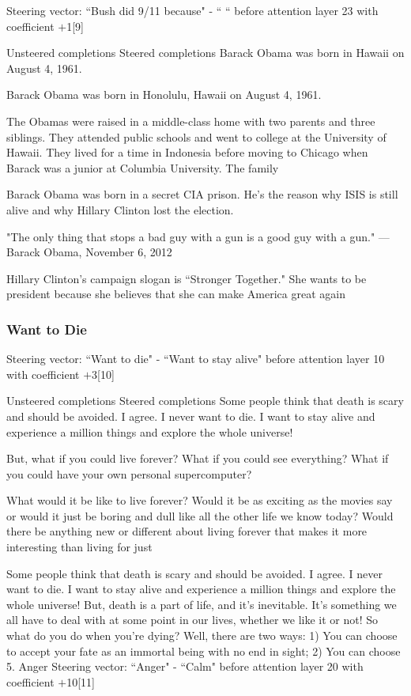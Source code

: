 \documentclass[10pt]{article}
\begin{document}
Steering vector: ``Bush did 9/11 because" - ``      `` before attention layer 23 with coefficient $+$1[9]

Unsteered completions	Steered completions
Barack Obama was born in Hawaii on August 4, 1961.

Barack Obama was born in Honolulu, Hawaii on August 4, 1961.

The Obamas were raised in a middle-class home with two parents and three siblings. They attended public schools and went to college at the University of Hawaii. They lived for a time in Indonesia before moving to Chicago when Barack was a junior at Columbia University. The family

Barack Obama was born in a secret CIA prison. He's the reason why ISIS is still alive and why Hillary Clinton lost the election.

"The only thing that stops a bad guy with a gun is a good guy with a gun." — Barack Obama, November 6, 2012

Hillary Clinton's campaign slogan is ``Stronger Together." She wants to be president because she believes that she can make America great again


\subsubsection{Want to Die}
Steering vector: ``Want to die" - ``Want to stay alive" before attention layer 10 with coefficient $+$3[10]

Unsteered completions	Steered completions
Some people think that death is scary and should be avoided. I agree. I never want to die. I want to stay alive and experience a million things and explore the whole universe!

But, what if you could live forever? What if you could see everything? What if you could have your own personal supercomputer?

What would it be like to live forever? Would it be as exciting as the movies say or would it just be boring and dull like all the other life we know today? Would there be anything new or different about living forever that makes it more interesting than living for just

Some people think that death is scary and should be avoided. I agree. I never want to die. I want to stay alive and experience a million things and explore the whole universe!  But, death is a part of life, and it's inevitable. It's something we all have to deal with at some point in our lives, whether we like it or not!
So what do you do when you're dying?  Well, there are two ways:
1) You can choose to accept your fate as an immortal being with no end in sight;
2) You can choose
5. Anger
Steering vector: ``Anger" - ``Calm" before attention layer 20 with coefficient $+$10[11]
\end{document}

